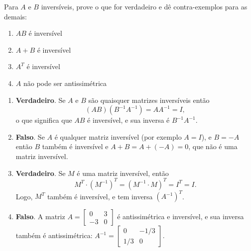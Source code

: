 \documentclass[12pt,a4paper]{article}
\begin{document}
\begin{ExerciseList}
\Exercise[title={1,8}]
Para $A$ e $B$ inversíveis, prove o que for verdadeiro e dê contra-exemplos para as demais:

\begin{multicols}{2}
\begin{enumerate}
\item $AB$ é inversível
\item $A+B$ é inversível
\item $A^T$ é inversível
\item $A$ não pode ser antissimétrica
\end{enumerate}
\end{multicols}
\Answer
\begin{enumerate}
\item \textbf{Verdadeiro}. Se $A$ e $B$ são quaisquer matrizes inversíveis então
\[(AB)(B^{-1}A^{-1}) = A A^{-1} = I,\]
o que significa que $AB$ é inversível, e sua inversa é $B^{-1}A^{-1}$.
\item \textbf{Falso}. Se $A$ é qualquer matriz inversível (por exemplo $A=I$), e $B = -A$ então $B$ também é inversível e $A + B = A+(-A) = 0$, que não é uma matriz inversível.
\item \textbf{Verdadeiro}. Se $M$ é uma matriz inversível, então
\[
M^T \cdot (M^{-1})^T
= (M^{-1} \cdot M)^T
= I^T
= I.
\]
Logo, $M^T$ também é inversível, e tem inversa $(A^{-1})^T$.
\item \textbf{Falso}. A matriz $A = \begin{bmatrix}
0 & 3\\
-3 & 0
\end{bmatrix}$ é antissimétrica e inversível, e sua inversa também é antissimétrica: $A^{-1} = \begin{bmatrix}
0 & -1/3 \\1/3 & 0
\end{bmatrix}$.
\end{enumerate}




\end{ExerciseList}
\end{document}
